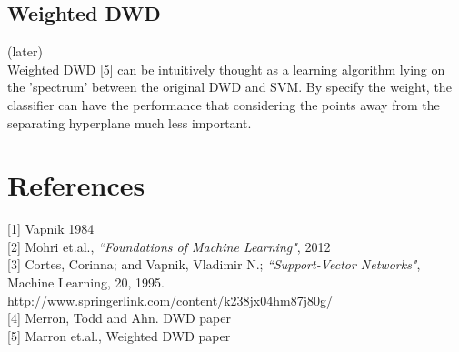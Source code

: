 \documentclass[12pt]{article}
\theoremstyle{definition}
\theoremstyle{remark}
\numberwithin{equation}{section}
\begin{document}
\subsection{Weighted DWD}
(later) \\[0.2cm]
Weighted DWD [5] can be intuitively thought as a learning algorithm lying on the 'spectrum' between the original DWD and SVM. By specify the weight, the classifier can have the performance that considering the points away from the separating hyperplane much less important. 
\section{References}
[1] Vapnik 1984 \\[0.2cm]
[2] Mohri et.al., \emph{``Foundations of Machine Learning"}, 2012 \\ [0.2cm]
[3] Cortes, Corinna; and Vapnik, Vladimir N.; \emph{``Support-Vector Networks"}, Machine Learning, 20, 1995.\\ http://www.springerlink.com/content/k238jx04hm87j80g/ \\[0.2cm]
[4] Merron, Todd and Ahn. DWD paper \\[0.2cm]
[5] Marron et.al., Weighted DWD paper
\end{document}
